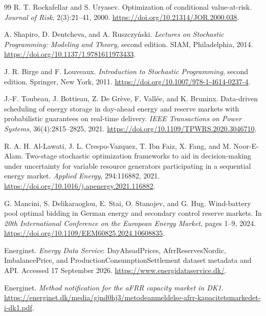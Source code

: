 \documentclass[11pt,a4paper]{article}
\begin{document}
\begin{thebibliography}{99}
R. T. Rockafellar and S. Uryasev.
\newblock Optimization of conditional value-at-risk.
\newblock \emph{Journal of Risk}, 2(3):21--41, 2000.
\newblock \url{https://doi.org/10.21314/JOR.2000.038}.

A. Shapiro, D. Dentcheva, and A. Ruszczy\'nski.
\newblock \emph{Lectures on Stochastic Programming: Modeling and Theory},
second edition.
\newblock SIAM, Philadelphia, 2014.
\newblock \url{https://doi.org/10.1137/1.9781611973433}.

J. R. Birge and F. Louveaux.
\newblock \emph{Introduction to Stochastic Programming}, second edition.
\newblock Springer, New York, 2011.
\newblock \url{https://doi.org/10.1007/978-1-4614-0237-4}.

J.-F. Toubeau, J. Bottieau, Z. De Gr\`eve, F. Vall\'ee, and K. Bruninx.
\newblock Data-driven scheduling of energy storage in day-ahead energy and
reserve markets with probabilistic guarantees on real-time delivery.
\newblock \emph{IEEE Transactions on Power Systems}, 36(4):2815--2825, 2021.
\newblock \url{https://doi.org/10.1109/TPWRS.2020.3046710}.

R. A. H. Al-Lawati, J. L. Crespo-Vazquez, T. Ibn Faiz, X. Fang, and
M. Noor-E-Alam.
\newblock Two-stage stochastic optimization frameworks to aid in
decision-making under uncertainty for variable resource generators
participating in a sequential energy market.
\newblock \emph{Applied Energy}, 294:116882, 2021.
\newblock \url{https://doi.org/10.1016/j.apenergy.2021.116882}.

G. Mancini, S. Delikaraoglou, E. Stai, O. Stanojev, and G. Hug.
\newblock Wind-battery pool optimal bidding in German energy and secondary
control reserve markets.
\newblock In \emph{20th International Conference on the European Energy
Market}, pages 1--9, 2024.
\newblock \url{https://doi.org/10.1109/EEM60825.2024.10608835}.

Energinet.
\newblock \emph{Energy Data Service}: DayAheadPrices, AfrrReservesNordic,
ImbalancePrice, and ProductionConsumptionSettlement dataset metadata and API.
\newblock Accessed 17 September 2026.
\newblock \url{https://www.energidataservice.dk/}.

Energinet.
\newblock \emph{Method notification for the aFRR capacity market in DK1}.
\newblock \url{https://energinet.dk/media/gjnd0hj3/metodeanmeldelse-afrr-kapacitetsmarkedet-i-dk1.pdf}.


\end{thebibliography}
\end{document}
